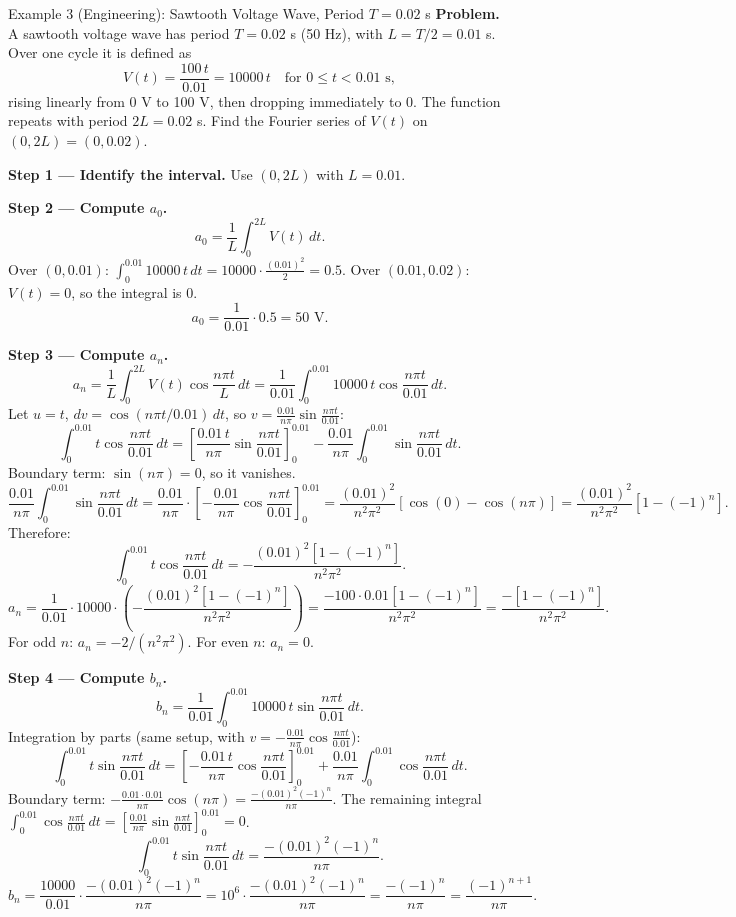 \documentclass[12pt,a4paper]{article}
\begin{document}
\begin{infobox}{Example 3 (Engineering): Sawtooth Voltage Wave, Period $T = 0.02$ s}
\textbf{Problem.}
A sawtooth voltage wave has period $T = 0.02$ s (50 Hz), with $L = T/2 = 0.01$ s.
Over one cycle it is defined as
\[
V(t) = \frac{100\,t}{0.01} = 10000\,t \quad \text{for } 0 \le t < 0.01\text{ s},
\]
rising linearly from 0 V to 100 V, then dropping immediately to 0.
The function repeats with period $2L = 0.02$ s.
Find the Fourier series of $V(t)$ on $(0, 2L) = (0, 0.02)$.

\medskip
\textbf{Step 1 --- Identify the interval.}
Use $(0, 2L)$ with $L = 0.01$.

\textbf{Step 2 --- Compute $a_0$.}
\[
a_0 = \frac{1}{L}\int_0^{2L} V(t)\,dt.
\]
Over $(0, 0.01)$: $\int_0^{0.01} 10000\,t\,dt = 10000\cdot\frac{(0.01)^2}{2} = 0.5$.
Over $(0.01, 0.02)$: $V(t) = 0$, so the integral is 0.
\[
a_0 = \frac{1}{0.01}\cdot 0.5 = 50 \text{ V}.
\]

\textbf{Step 3 --- Compute $a_n$.}
\[
a_n = \frac{1}{L}\int_0^{2L} V(t)\cos\frac{n\pi t}{L}\,dt
= \frac{1}{0.01}\int_0^{0.01} 10000\,t\cos\frac{n\pi t}{0.01}\,dt.
\]
Let $u = t$, $dv = \cos(n\pi t/0.01)\,dt$, so $v = \frac{0.01}{n\pi}\sin\frac{n\pi t}{0.01}$:
\[
\int_0^{0.01}t\cos\frac{n\pi t}{0.01}\,dt
= \left[\frac{0.01\,t}{n\pi}\sin\frac{n\pi t}{0.01}\right]_0^{0.01}
  - \frac{0.01}{n\pi}\int_0^{0.01}\sin\frac{n\pi t}{0.01}\,dt.
\]
Boundary term: $\sin(n\pi)=0$, so it vanishes.
\[
\frac{0.01}{n\pi}\int_0^{0.01}\sin\frac{n\pi t}{0.01}\,dt
= \frac{0.01}{n\pi}\cdot\left[-\frac{0.01}{n\pi}\cos\frac{n\pi t}{0.01}\right]_0^{0.01}
= \frac{(0.01)^2}{n^2\pi^2}[\cos(0)-\cos(n\pi)]
= \frac{(0.01)^2}{n^2\pi^2}[1-(-1)^n].
\]
Therefore:
\[
\int_0^{0.01}t\cos\frac{n\pi t}{0.01}\,dt = -\frac{(0.01)^2[1-(-1)^n]}{n^2\pi^2}.
\]
\[
a_n = \frac{1}{0.01}\cdot 10000\cdot\left(-\frac{(0.01)^2[1-(-1)^n]}{n^2\pi^2}\right)
= \frac{-100\cdot 0.01[1-(-1)^n]}{n^2\pi^2}
= \frac{-[1-(-1)^n]}{n^2\pi^2}.
\]
For odd $n$: $a_n = -2/(n^2\pi^2)$. For even $n$: $a_n = 0$.

\textbf{Step 4 --- Compute $b_n$.}
\[
b_n = \frac{1}{0.01}\int_0^{0.01}10000\,t\sin\frac{n\pi t}{0.01}\,dt.
\]
Integration by parts (same setup, with $v = -\frac{0.01}{n\pi}\cos\frac{n\pi t}{0.01}$):
\[
\int_0^{0.01}t\sin\frac{n\pi t}{0.01}\,dt
= \left[-\frac{0.01\,t}{n\pi}\cos\frac{n\pi t}{0.01}\right]_0^{0.01}
  + \frac{0.01}{n\pi}\int_0^{0.01}\cos\frac{n\pi t}{0.01}\,dt.
\]
Boundary term: $-\frac{0.01\cdot 0.01}{n\pi}\cos(n\pi) = \frac{-(0.01)^2(-1)^n}{n\pi}$.
The remaining integral $\int_0^{0.01}\cos\frac{n\pi t}{0.01}\,dt = \left[\frac{0.01}{n\pi}\sin\frac{n\pi t}{0.01}\right]_0^{0.01}=0$.
\[
\int_0^{0.01}t\sin\frac{n\pi t}{0.01}\,dt = \frac{-(0.01)^2(-1)^n}{n\pi}.
\]
\[
b_n = \frac{10000}{0.01}\cdot\frac{-(0.01)^2(-1)^n}{n\pi}
= 10^6\cdot\frac{-(0.01)^2(-1)^n}{n\pi}
= \frac{-(-1)^n}{n\pi}
= \frac{(-1)^{n+1}}{n\pi}.
\]


\end{infobox}
\end{document}
